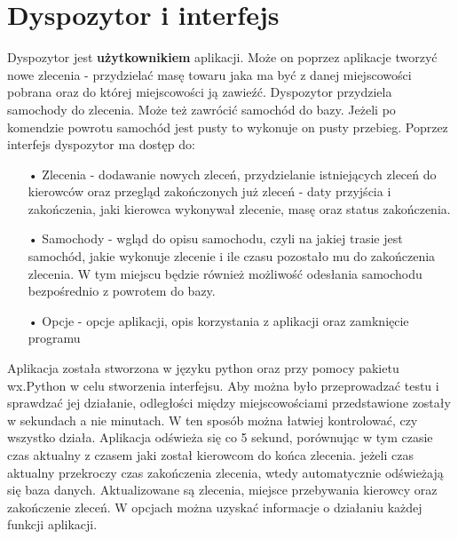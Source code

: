 \documentclass[11pt,a4paper]{mwart}
\begin{document}
\section{Dyspozytor i interfejs}
Dyspozytor jest \textbf{użytkownikiem} aplikacji. Może on poprzez aplikacje tworzyć nowe zlecenia - przydzielać masę towaru jaka ma być z danej miejscowości pobrana oraz do której miejscowości ją zawieźć. Dyspozytor przydziela samochody do zlecenia. Może też zawrócić samochód do bazy. Jeżeli po komendzie powrotu samochód jest pusty to wykonuje on pusty przebieg. 
Poprzez interfejs dyspozytor ma dostęp do:
\begin{flushleft}
\begin{enumerate}
\item[• Zlecenia] - dodawanie nowych zleceń, przydzielanie istniejących zleceń do kierowców oraz przegląd zakończonych już zleceń - daty przyjścia i zakończenia, jaki kierowca wykonywał zlecenie, masę oraz status zakończenia.
\item[• Samochody] - wgląd do opisu samochodu, czyli na jakiej trasie jest samochód, jakie wykonuje zlecenie i ile czasu pozostało mu do zakończenia zlecenia. W tym miejscu będzie również możliwość odesłania samochodu bezpośrednio z powrotem do bazy.
\item[• Opcje] - opcje aplikacji, opis korzystania z aplikacji oraz zamknięcie programu
\end{enumerate}
\end{flushleft}
Aplikacja została stworzona w języku python oraz przy pomocy pakietu wx.Python w celu stworzenia interfejsu. Aby można było przeprowadzać testu i sprawdzać jej działanie, odległości między miejscowościami przedstawione zostały w sekundach a nie minutach. W ten sposób można łatwiej kontrolować, czy wszystko działa. Aplikacja odświeża się co 5 sekund, porównując w tym czasie czas aktualny z czasem jaki został kierowcom do końca zlecenia. jeżeli czas aktualny przekroczy czas zakończenia zlecenia, wtedy automatycznie odświeżają się baza danych. Aktualizowane są zlecenia, miejsce przebywania kierowcy oraz zakończenie zleceń. W opcjach można uzyskać informacje o działaniu każdej funkcji aplikacji.
\end{document}
